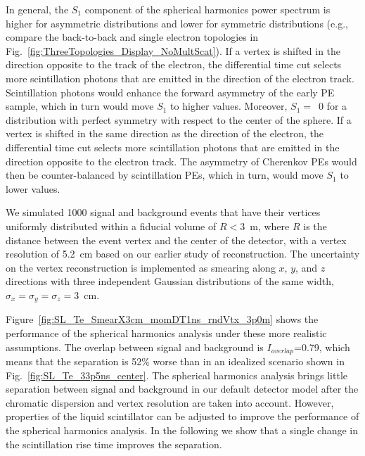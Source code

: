 In general, the $S_1$ component of the spherical harmonics power
spectrum is higher for asymmetric distributions and lower for
symmetric distributions (e.g., compare the back-to-back and single
electron topologies in
Fig.~\ref{fig:ThreeTopologies_Display_NoMultScat}). If a vertex is 
shifted in the direction opposite to the track of the electron, the
differential time cut selects more scintillation photons that are
emitted in the direction of the electron track.  Scintillation photons
would enhance the forward asymmetry of the early PE sample, which
in turn would move $S_1$ to higher values.  Moreover, $S_1=$~0 for a
distribution with perfect symmetry with respect to the center of the
sphere.  If a vertex is shifted in the same direction as the direction
of the electron, the differential time cut selects more scintillation
photons that are emitted in the direction opposite to the electron
track. The asymmetry of Cherenkov PEs would then be counter-balanced
by scintillation PEs, which in turn, would move $S_1$ to lower values.



We simulated 1000 signal and background events that have their
vertices uniformly distributed within a fiducial volume of $R<3$~m,
where $R$ is the distance between the event vertex and the center of
the detector, with a vertex resolution of 5.2~cm based on our earlier study of
reconstruction\cite{Aberle2014}. 
The uncertainty on the vertex reconstruction is implemented as smearing
along $x$, $y$, and $z$ directions with three independent Gaussian distributions 
of the same width, $\sigma_x = \sigma_y = \sigma_z =$3~cm.


Figure~\ref{fig:SL_Te_SmearX3cm_momDT1ns_rndVtx_3p0m} shows the
performance of the spherical harmonics analysis under these more
realistic assumptions. The overlap between signal and background is
$I_{overlap}$=0.79, which means that the separation is 52\% worse than
in an idealized scenario shown in Fig.~\ref{fig:SL_Te_33p5ns_center}.
The spherical harmonics analysis brings little separation between
signal and background in our default detector model after the
chromatic dispersion and vertex resolution are taken into
account. However, properties of the liquid scintillator can be
adjusted to improve the performance of the spherical harmonics
analysis. In the following we show that a single change in the
scintillation rise time improves the separation.



